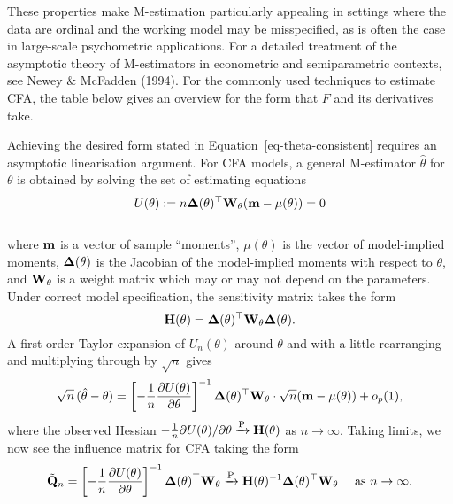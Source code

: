 \documentclass[
  letterpaper,
  DIV=11,
  numbers=noendperiod]{scrartcl}
\begin{document}
These properties make M-estimation particularly appealing in settings
where the data are ordinal and the working model may be misspecified, as
is often the case in large-scale psychometric applications. For a
detailed treatment of the asymptotic theory of M-estimators in
econometric and semiparametric contexts, see Newey \& McFadden (1994).
For the commonly used techniques to estimate CFA, the table below gives
an overview for the form that \(F\) and its derivatives take.

\begin{table}

\caption{\label{tbl-objfun-deriv}}


\end{table}%

Achieving the desired form stated in Equation~\ref{eq-theta-consistent}
requires an asymptotic linearisation argument. For CFA models, a general
M-estimator \(\hat\theta\) for \(\theta\) is obtained by solving the set
of estimating equations \[
U(\theta) := n {\boldsymbol\Delta}(\theta)^\top {\mathbf W}_{\theta} ({\mathbf m} - \mu(\theta)) = 0
\]\\
where \({\mathbf m}\) is a vector of sample ``moments'', \(\mu(\theta)\) is the
vector of model-implied moments, \({\boldsymbol\Delta}(\theta)\) is the Jacobian of
the model-implied moments with respect to \(\theta\), and
\({\mathbf W}_{\theta}\) is a weight matrix which may or may not depend on the
parameters. Under correct model specification, the sensitivity matrix
takes the form \[
{\mathbf H}(\theta) = {\boldsymbol\Delta}(\theta)^{\top} {\mathbf W}_{\theta}  {\boldsymbol\Delta}(\theta).
\] A first-order Taylor expansion of \(U_n(\theta)\) around \(\theta\)
and with a little rearranging and multiplying through by \(\sqrt n\)
gives\\
\[
\sqrt{n}\,(\hat\theta - \theta)
=
\left[ - \frac{1}{n} \frac{\partial U(\theta)}{\partial\theta} \right]^{-1}
{\boldsymbol\Delta}(\theta)^\top {\mathbf W}_{\theta} \cdot \sqrt n ({\mathbf m} - \mu(\theta))
+ o_p(1),
\] where the observed Hessian
\(-\frac{1}{n}\partial U(\theta) / \partial\theta \xrightarrow{\text P} {\mathbf H}(\theta)\)
as \(n \to \infty\). Taking limits, we now see the influence matrix for
CFA taking the form \[
\tilde {{\mathbf Q}}_n = \left[ - \frac{1}{n} \frac{\partial U(\theta)}{\partial\theta} \right]^{-1}
{\boldsymbol\Delta}(\theta)^\top {\mathbf W}_{\theta} \xrightarrow{\text P} {\mathbf H}(\theta)^{-1} {\boldsymbol\Delta}(\theta)^\top {\mathbf W}_{\theta} \quad \text{ as } n\to\infty.
\]
\end{document}
